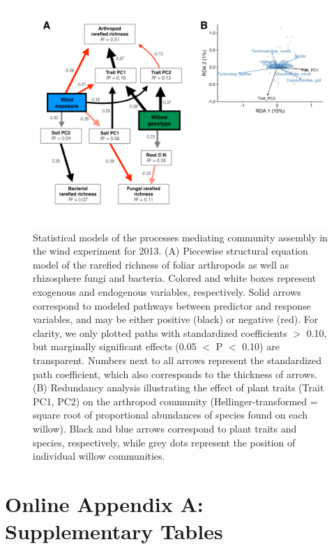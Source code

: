 \documentclass[11pt]{article}
\begin{document}
\begin{figure}%
\centering
\includegraphics[scale = 0.45]{image05.png}
\caption{Statistical models of the processes mediating
community assembly in the wind experiment for 2013. (A) Piecewise
structural equation model of the rarefied richness of foliar arthropods
as well as rhizosphere fungi and bacteria. Colored and white boxes represent
exogenous and endogenous variables, respectively. Solid
arrows correspond to modeled pathways between predictor and response
variables, and may be either positive (black) or negative (red). For clarity,
we only plotted paths with standardized coefficients $>$
0.10, but marginally significant effects (0.05 $<$ P $<$ 0.10) are transparent. Numbers next to all arrows represent the standardized path
coefficient, which also corresponds to the thickness of arrows. (B)
Redundancy analysis illustrating the effect of plant traits (Trait PC1, PC2) on the arthropod community (Hellinger-transformed = square root of proportional abundances of species found on each willow).
Black and blue arrows correspond to plant traits and species,
respectively, while grey
dots represent the position of individual willow communities.}
\label{wSEM}
\end{figure}

\newpage{}

\renewcommand{\thesection}{\Alph{section}}

\section*{Online Appendix A: Supplementary Tables}
\end{document}
